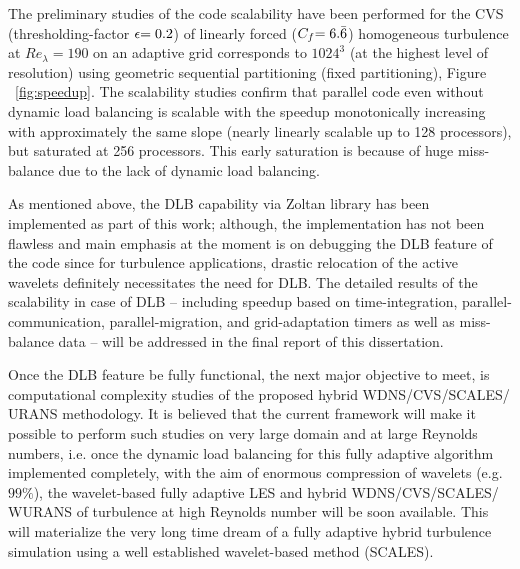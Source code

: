 \begin{itemize}
{The preliminary studies of the code scalability have been performed for
the CVS (thresholding-factor $\epsilon\rm{=0.2}$)
of linearly forced ($C_f\rm{=6.\bar{6}}$) homogeneous turbulence at $Re_{\lambda}=190$
on an adaptive grid corresponds to  $1024^3$ (at the highest level of resolution)
using geometric sequential partitioning (fixed partitioning), Figure ~\ref{fig:speedup}.
The scalability studies confirm that parallel code even without dynamic load balancing is scalable
with the speedup monotonically increasing with
approximately the same slope (nearly linearly scalable up to 128 processors),
but saturated at 256 processors.
%
This early saturation is because of huge miss-balance due to the lack of dynamic load balancing.

As mentioned above, the DLB capability via Zoltan library has been implemented as part of this work; although, the implementation has not been flawless and main emphasis at the moment is on debugging the DLB feature of the code since for turbulence applications, drastic relocation of the active wavelets definitely necessitates the need for DLB. The detailed results of the scalability in case of DLB -- including speedup based on time-integration, parallel-communication, parallel-migration, and grid-adaptation timers as well as miss-balance data -- will be addressed in the final report of this dissertation.

Once the DLB feature be fully functional, the next major objective to meet, is computational complexity studies of the proposed hybrid WDNS/CVS/SCALES/\\URANS methodology. It is believed that the current framework will make it possible to perform such studies on very large domain and at large Reynolds numbers, i.e. once the dynamic load balancing for this fully adaptive algorithm implemented completely,
with the aim of enormous compression of wavelets (e.g. $99\%$),
the wavelet-based fully adaptive LES and hybrid WDNS/CVS/SCALES/\\WURANS
of turbulence at high Reynolds number will be soon available.
This will materialize the very long time dream of a fully adaptive hybrid turbulence simulation
using a well established wavelet-based method (SCALES).
 
}
\end{itemize}
